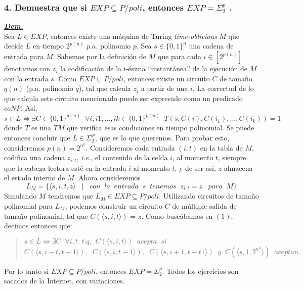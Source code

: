 \documentclass[12pt]{article}
\begin{document}
\subsubsection*{4. Demuestra que si $EXP \subseteq P/poli$, entonces $EXP = \Sigma^p_2$ .}
\underline{\textbf{\textit{Dem.}}}\\
Sea $L \in EXP$, entonces existe una máquina de Turing \textit{time-oblivious} $M$ que decide $L$ en tiempo $2^{p(n)}$ $p.a.$ polinomio $p$. Sea $s \in \{0,1\}^n$ una cadena de entrada para $M$. Sabemos por la definición de $M$ que para cada $i \in [2^{p(n)}]$ denotamos con $z_i$ la codificación de
la i-ésima ``instantánea'' de la ejecución de $M$ con la entrada $s$.
Como $EXP \subseteq P/poli$, entonces existe un circuito $C$ de tamaño $q(n)$ (p.a. polinomio $q$), tal que calcula $z_i$ a partir de una $i$.
La correctud de lo que calcula este circuito mencionado puede ser expresado como un predicado $coNP$. Así, \\
\begin{equation}
  s \in L \iff \exists C \in \{0,1\}^{q(n)}\;\; \forall i,i1,...,ik \in \{0,1\}^{p(n)}\;\; T(s,C(i),C(i_1),...,C(i_k)) = 1
\end{equation}
donde $T$ es una $TM$ que verifica esas condiciones en tiempo polinomial. Se puede entonces concluir que $L \in \Sigma^P_2$, que es lo que queremos.
Para probar esto, consideremos $p(n) = 2^{n^k}$. Consideremos cada entrada $(i,t)$ en la tabla de $M$, codifica una cadena $z_{i,t}$, \textit{i.e.}, el contenido
de la celda $i$, al momento $t$, siempre que la cabeza lectora esté en la entrada $i$ al momento $t$, y de ser así, $z$ almacena el estado interno
de $M$. Ahora consideremos
\begin{equation}
  L_M = \{\langle s, i, t, z\rangle \;\;\;|\;\;\; con\;\;la\;\;entrada\;\;s\;\;tenemos\;\; z_{i,t} = z \;\;\;para\;\; M \}
\end{equation}
Simulando $M$ tendremos que $L_M \in EXP \subseteq P/poli$. Utilizando
circuitos de tamaño polinomial para $L_M$, podemos construir un circuito
$C$ de múltiple salida de tamaño polinomial, tal que $C(\langle s,i,t\rangle)$ = $z$. Como buscábamos en $(1)$, decimos entonces que:\\
\begin{quote}
$  s \in L \iff \exists C\;\; \forall i,t\;\; t.q.\;\; C(\langle s,i,t\rangle)\;\; acepta\;\;
si$\\
$C(\langle s,i-t,t-1\rangle),\;\;C(\langle s,i,t-1\rangle),\;\;C(\langle s,i+1,t-t1\rangle)\;\; y\;\; C(\langle s,1,2^{n^k}\rangle)\;\; aceptan.$
\end{quote}
Por lo tanto si $EXP \subseteq P/poli$, entonces $EXP = \Sigma^p_2$.
Todos los ejercicios son sacados de la Internet, con variaciones.
\end{document}
